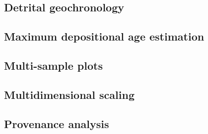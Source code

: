\begin{refsection}

\chapter{Detrital geochronology}\label{ch:detrital}

\section{Maximum depositional age estimation}

\section{Multi-sample plots}

\section{Multidimensional scaling}

\section{Provenance analysis}

\printbibliography[heading=subbibliography]

\end{refsection}

